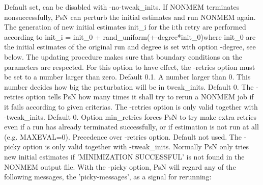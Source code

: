 \begin{optionlist}
Default set, can be disabled with -no-tweak\_inits. 
If NONMEM terminates nonsuccessfully, PsN can perturb the initial estimates and run NONMEM again. The generation of new initial estimates init\_i for the i:th retry are performed according to init\_i = init\_0 + rand\_uniform(+-degree*init\_0)where init\_0 are the initial estimates of the original run
and degree is set with option -degree, see below. 
The updating procedure makes sure that boundary conditions on the parameters are respected. 
For this option to have effect, the -retries option must be set to a number larger than zero. 
\nextopt
{}
Default 0.1. A number larger than 0. This number decides how big the perturbation will
be in tweak\_inits.
\nextopt
{}
Default 0. The -retries option tells PsN how many times it shall try to rerun a NONMEM job if it fails according to given criterias. 
The -retries option is only valid together with -tweak\_inits. 
\nextopt
{}
Default 0. Option min\_retries forces PsN to try make extra retries even if a run has already terminated successfully,
or if estimation is not run at all (e.g. MAXEVAL=0). Precedence over -retries option.  
\nextopt
{}
Default not used. The -picky option is only valid together with -tweak\_inits. Normally PsN only tries new initial estimates if 'MINIMIZATION SUCCESSFUL' is not found in the NONMEM output file. With the -picky option, PsN will regard any of the following messages, the 'picky-messages',  as a signal for rerunning:



\end{optionlist}
